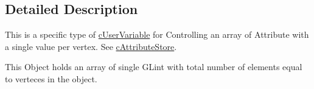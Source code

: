 \subsection{Detailed Description}
This is a specific type of \hyperlink{classc_user_variable}{cUserVariable} for Controlling an array of Attribute with a single value per vertex. See \hyperlink{classc_attribute_store}{cAttributeStore}. 

This Object holds an array of single GLint with total number of elements equal to verteces in the object. 